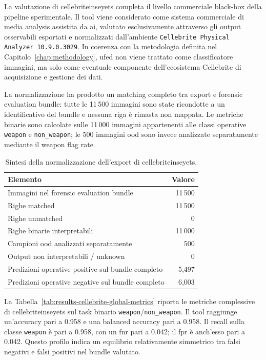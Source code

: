 La valutazione di \gls{cellebriteinseyets} completa il livello commerciale
black-box della pipeline sperimentale. Il tool viene considerato come sistema
commerciale di media analysis assistita da \gls{ai}, valutato esclusivamente
attraverso gli output osservabili esportati e normalizzati dall'ambiente
\texttt{Cellebrite Physical Analyzer 10.9.0.3029}. In coerenza con la
metodologia definita nel Capitolo~\ref{chap:methodology}, \gls{ufed} non viene
trattato come classificatore immagini, ma solo come eventuale componente
dell'ecosistema Cellebrite di acquisizione e gestione dei dati.

La normalizzazione ha prodotto un matching completo tra export e forensic
evaluation bundle: tutte le 11\,500 immagini sono state ricondotte a un
identificativo del bundle e nessuna riga è rimasta non mappata. Le metriche
binarie sono calcolate sulle 11\,000 immagini appartenenti alle classi operative
\texttt{weapon} e \texttt{non\_weapon}; le 500 immagini \gls{ood} sono invece
analizzate separatamente mediante il weapon flag rate.

\begin{table}[H]
\centering
\caption{Sintesi della normalizzazione dell'export di \gls{cellebriteinseyets}.}
\label{tab:results-cellebrite-normalization-summary}
\small
\begin{tabular}{lr}
\toprule
\textbf{Elemento} & \textbf{Valore} \\
\midrule
Immagini nel forensic evaluation bundle & 11\,500 \\
Righe matched & 11\,500 \\
Righe unmatched & 0 \\
Righe binarie interpretabili & 11\,000 \\
Campioni \gls{ood} analizzati separatamente & 500 \\
Output non interpretabili / unknown & 0 \\
Predizioni operative positive sul bundle completo & 5,497 \\
Predizioni operative negative sul bundle completo & 6,003 \\
\bottomrule
\end{tabular}
\end{table}

La Tabella~\ref{tab:results-cellebrite-global-metrics} riporta le metriche
complessive di \gls{cellebriteinseyets} sul task binario
\texttt{weapon}/\texttt{non\_weapon}. Il tool raggiunge un'accuracy pari a
0.958 e una balanced accuracy pari a 0.958. Il recall sulla classe
\texttt{weapon} è pari a 0.958, con un \gls{fnr} pari a 0.042; il \gls{fpr} è
anch'esso pari a 0.042. Questo profilo indica un equilibrio relativamente
simmetrico tra falsi negativi e falsi positivi nel bundle valutato.

